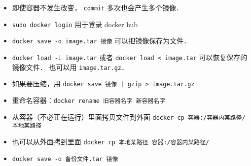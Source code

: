 \begin{itemize}
\item 即使容器不发生改变， \verb|commit| 多次也会产生多个镜像．
\item \verb`sudo docker login` 用于登录 docker hub
\item \verb|docker save -o image.tar 镜像| 可以把镜像保存为文件．
\item \verb|docker load -i image.tar| 或者 \verb|docker load < image.tar| 可以恢复保存的镜像文件． 也可以用 \verb|image.tar.gz|．
\item 如果要压缩，用 \verb`docker save 镜像 | gzip > image.tar.gz`
\item 重命名容器：\verb|docker rename 旧容器名字 新容器名字|
\item 从容器（不必正在运行）里面拷贝文件到外面 \verb|docker cp 容器:/容器内某路径/ 本地某路径|
\item 也可以从外面拷到里面 \verb|docker cp 本地某路径 容器:/容器内某路径/|
\item \verb|docker save -o 备份文件.tar 镜像|
\end{itemize}

